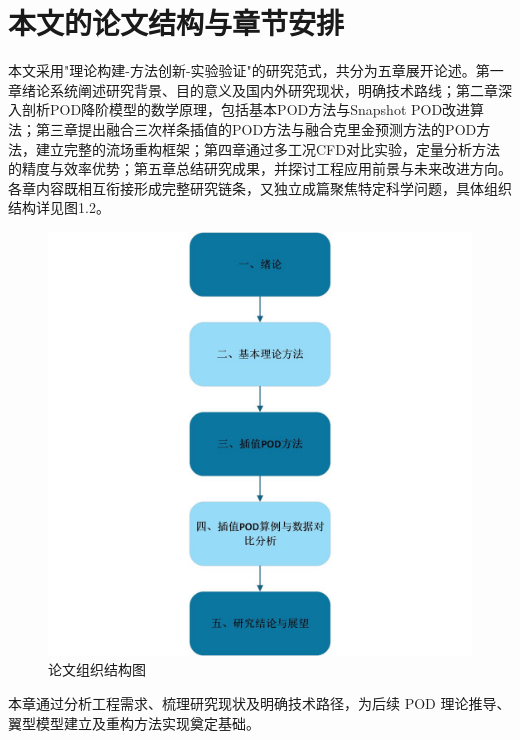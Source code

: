 \section{本文的论文结构与章节安排}
本文采用"理论构建-方法创新-实验验证"的研究范式，共分为五章展开论述。第一章绪论系统阐述研究背景、目的意义及国内外研究现状，明确技术路线；第二章深入剖析POD降阶模型的数学原理，包括基本POD方法与Snapshot POD改进算法；第三章提出融合三次样条插值的POD方法与融合克里金预测方法的POD方法，建立完整的流场重构框架；第四章通过多工况CFD对比实验，定量分析方法的精度与效率优势；第五章总结研究成果，并探讨工程应用前景与未来改进方向。各章内容既相互衔接形成完整研究链条，又独立成篇聚焦特定科学问题，具体组织结构详见图1.2。
\begin{figure}[H]
    \centering
    \includegraphics[width=1.0\linewidth]{论文结构图.jpg}
    \caption{论文组织结构图}
    \label{fig:enter-label}
\end{figure}
本章通过分析工程需求、梳理研究现状及明确技术路径，为后续 POD 理论推导、翼型模型建立及重构方法实现奠定基础。